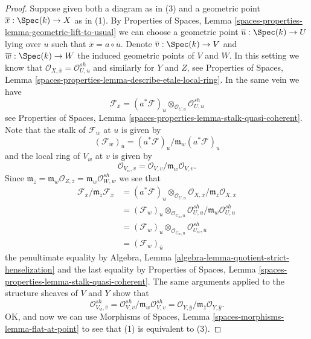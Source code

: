 \begin{proof}
\medskip\noindent
Suppose given both a diagram as in (3) and a geometric point
$\overline{x} : \Spec(k) \to X$ as in (1). By
Properties of Spaces, Lemma
\ref{spaces-properties-lemma-geometric-lift-to-usual}
we can choose a geometric point $\overline{u} : \Spec(k) \to U$
lying over $u$ such that $\overline{x} = a \circ \overline{u}$.
Denote $\overline{v} : \Spec(k) \to V$ and
$\overline{w} : \Spec(k) \to W$ the induced geometric points of
$V$ and $W$. In this setting we know that
$\mathcal{O}_{X, \overline{x}} = \mathcal{O}_{U, u}^{sh}$
and similarly for $Y$ and $Z$, see
Properties of Spaces,
Lemma \ref{spaces-properties-lemma-describe-etale-local-ring}.
In the same vein we have
$$
\mathcal{F}_{\overline{x}} =
(a^*\mathcal{F})_u \otimes_{\mathcal{O}_{U, u}}
\mathcal{O}_{U, u}^{sh}
$$
see
Properties of Spaces, Lemma \ref{spaces-properties-lemma-stalk-quasi-coherent}.
Note that the stalk of $\mathcal{F}_w$ at $u$ is given by
$$
(\mathcal{F}_w)_u = (a^*\mathcal{F})_u/\mathfrak m_w(a^*\mathcal{F})_u
$$
and the local ring of $V_w$ at $v$ is given by
$$
\mathcal{O}_{V_w, v} = \mathcal{O}_{V, v}/\mathfrak m_w\mathcal{O}_{V, v}.
$$
Since $\mathfrak m_{\overline{z}} =
\mathfrak m_w \mathcal{O}_{Z, \overline{z}} =
\mathfrak m_w \mathcal{O}_{W, w}^{sh}$
we see that
\begin{align*}
\mathcal{F}_{\overline{x}}/
\mathfrak m_{\overline{z}}\mathcal{F}_{\overline{x}} & =
(a^*\mathcal{F})_u \otimes_{\mathcal{O}_{U, u}}
\mathcal{O}_{X, \overline{x}}/
\mathfrak m_{\overline{z}}\mathcal{O}_{X, \overline{x}} \\
& =
(\mathcal{F}_w)_u \otimes_{\mathcal{O}_{U_w, u}}
\mathcal{O}_{U, u}^{sh}/\mathfrak m_w\mathcal{O}_{U, u}^{sh} \\
& = (\mathcal{F}_w)_u \otimes_{\mathcal{O}_{U_w, u}}
\mathcal{O}_{U_w, \overline{u}}^{sh} \\
& = (\mathcal{F}_w)_{\overline{u}}
\end{align*}
the penultimate equality by
Algebra, Lemma \ref{algebra-lemma-quotient-strict-henselization}
and the last equality by
Properties of Spaces, Lemma \ref{spaces-properties-lemma-stalk-quasi-coherent}.
The same arguments applied to the structure sheaves of $V$ and $Y$
show that
$$
\mathcal{O}_{V_w, \overline{v}}^{sh} =
\mathcal{O}_{V, v}^{sh}/\mathfrak m_w \mathcal{O}_{V, v}^{sh} =
\mathcal{O}_{Y, \overline{y}}/
\mathfrak m_{\overline{z}}\mathcal{O}_{Y, \overline{y}}.
$$
OK, and now we can use
Morphisms of Spaces, Lemma \ref{spaces-morphisms-lemma-flat-at-point}
to see that (1) is equivalent to (3).


\end{proof}

